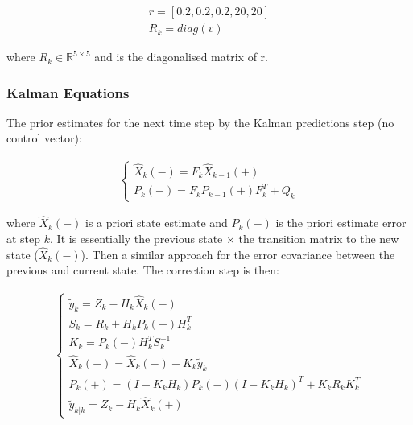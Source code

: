 \documentclass[11pt,twoside]{report}
\begin{document}
\begin{equation}
\begin{aligned}
r = [0.2,0.2,0.2,20,20] \\
R_{k} = diag(v)
\end{aligned}
\end{equation}

where $R_{k} \in \mathbb{R}^{5 \times 5}$ and is the diagonalised matrix of r. 

\subsubsection{Kalman Equations}
The prior estimates for the next time step by the Kalman predictions step (no control vector):

\begin{equation}
\label{Kalman_pred_eq}
\begin{aligned}
\begin{cases}
\hat{X}_{k}(-) =  F_{k} \hat{X}_{k-1}(+)\\
P_{k}(-) = F_{k} P_{k-1}(+) F_{k}^{T} + Q_{k}
\end{cases}
\end{aligned}
\end{equation}

where $\hat{X}_{k}(-)$ is a priori state estimate and $P_{k}(-)$ is the priori estimate error at step $k$. It is essentially the previous state $\times$ the transition matrix to the new state ($\hat{X}_{k}(-)$). Then a similar approach for the error covariance between the previous and current state. The correction step is then:

\begin{equation}
\begin{aligned}
\begin{cases}
\label{kalman_update_equs}
\tilde{y}_{k} = Z_{k} - H_{k} \hat{X}_{k}(-) \\
S_{k} = R_{k} + H_{k}P_{k}(-)H_{k}^{T} \\
K_{k} = P_{k}(-) H_{k}^{T} S_{k}^{-1} \\ 
\hat{X}_{k}(+) = \hat{X}_{k}(-) + K_{k} \tilde{y}_{k}\\
P_{k}(+) = (I-K_{k}H_{k}) P_{k}(-)(I-K_{k}H_{k})^{T} + K_{k}R_{k}K_{k}^{T} \\
\tilde{y}_{k|k} = Z_{k} - H_{k} \hat{X}_{k}(+)

\end{cases}
\end{aligned}
\end{equation}
\end{document}
